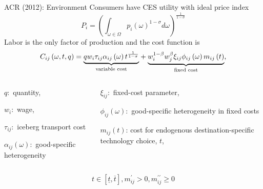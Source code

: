 \documentclass[10pt,notes=hide]{beamer}
\begin{document}
\begin{frame}{ACR (2012): Environment}
Consumers have CES utility with ideal price index 
\begin{equation*}
P_{i}=\left( \int_{\omega \in \Omega }p_{i}\left( \omega \right) ^{1-\sigma
}d\omega \right) ^{\frac{1}{1-\sigma }}
\end{equation*}
Labor is the only factor of production and the cost function is
\begin{equation*}
C_{ij}\left( \omega ,t,q\right) =\underset{\text{variable cost}}{\underbrace{%
qw_{i}\tau _{ij}\alpha _{ij}\left( \omega \right) t^{\frac{1}{1-\sigma }}}}+%
\underset{\text{fixed cost}}{\underbrace{w_{i}^{1-\beta }w_{j}^{\beta }\xi
_{ij}\phi _{ij}\left( \omega \right) m_{ij}\left( t\right) }}\text{,}
\end{equation*}
\begin{columns}
\begin{column}{.49\textwidth}
\begin{itemize}
{\footnotesize
\item $q:$ quantity,
\item $w_{i}:$ wage,
\item $\tau_{ij}:$ iceberg transport cost
\item $\alpha _{ij}\left( \omega \right):$ good-specific heterogeneity
}
\end{itemize}
\end{column}
\begin{column}{.49\textwidth}
\begin{itemize}
{\footnotesize
\item $\xi_{ij}:$ fixed-cost parameter,
\item $\phi_{ij}\left(\omega\right) :$ good-specific heterogeneity in fixed costs
\item $m_{ij}\left(t\right)$: cost for endogenous destination-specific
technology choice, $t$,
}
\end{itemize}
\end{column}
\end{columns}
\begin{equation*}
t\in \left[ \underline{t},\overline{t}\right],
m_{ij}^{\prime }>0, 
m_{ij}^{\prime \prime }\geq 0
\end{equation*}
\end{frame}
\end{document}
